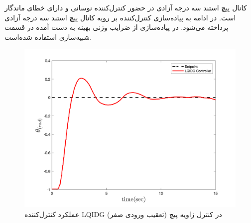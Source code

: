 \documentclass{CCI2020}
\begin{document}
کانال پیچ استند سه درجه آزادی در حضور کنترل‌کننده  نوسانی و دارای خطای ماندگار است.
در ادامه به پیاده‌سازی کنترل‌کننده  بر رویه کانال پیچ استند سه درجه آزادی پرداخته می‌شود.
در پیاده‌سازی از ضرایب وزنی بهینه به دست آمده در قسمت شبیه‌سازی استفاده شده‌است.
\begin{figure}[H]
	\includegraphics[width=.48\linewidth]{../Figures/Calibration/LQIDG/Pitch/lqidg_pitch.png}
	\centering
	\caption{عملكرد کنترل‌کننده  LQIDG در کنترل زاويه پیچ (تعقیب ورودی صفر)}
\end{figure}

\end{document}
